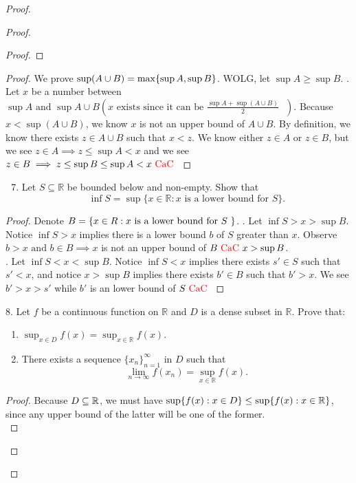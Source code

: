 \documentclass{report}
\begin{document}
\begin{proof}
\begin{proof}
\begin{proof}
\end{proof}
\begin{proof}
We prove $\sup (A\cup B)=\max \{ \sup A,\sup B \}$. WOLG, let $\sup A\geq \sup B$. . Let $x$ be a number between  $\sup A\text{ and }\sup A\cup B(x\text{ exists since it can be $\frac{\sup A+\sup (A\cup B)}{2}$ })$. Because $x<\sup (A\cup B)$, we know $x$ is not an upper bound of  $A\cup B$. By definition, we know there exists $z\in A\cup B$ such that $x<z$. We know either $z \in A$ or $z \in B$, but we see $z \in A\implies z\leq \sup A<x$ and we see $z \in B\implies z\leq \sup B\leq \sup A<x\text{ \textcolor{red}{CaC} }$
\end{proof}
\begin{question}{}{}
\begin{enumerate}
    \setcounter{enumi}{6}
    \item Let \( S \subseteq \mathbb{R} \) be bounded below and non-empty. Show that
    \[ \inf S = \sup\{ x \in \mathbb{R} : x \text{ is a lower bound for } S \}. \]
\end{enumerate}
\end{question}
\begin{proof}
Denote $B=\{ x\in R: x\text{ is a lower bound for $S$ } \}$. . Let $\inf S>x>\sup B$. Notice $\inf S>x$ implies there is a lower bound  $b$ of  $S$ greater than  $x$. Observe $b>x\text{ and }b \in B\implies x$ is not an upper bound of $B\text{ \textcolor{red}{CaC} } x>\sup B$.\\

. Let $\inf S<x<\sup B$. Notice $\inf S<x$ implies there exists $s' \in S$ such that $s'<x$, and notice $x> \sup B$ implies there exists $b'\in B$ such that $b'>x$. We see  $b'>x>s'$ while  $b'$ is an lower bound of  $S\text{ \textcolor{red}{CaC} }$
\end{proof}
\begin{question}{}{}
8. Let \( f \) be a continuous function on \( \mathbb{R} \) and \( D \) is a dense subset in \( \mathbb{R} \). Prove that:
\begin{enumerate}
    \item \( \sup_{x \in D} f(x) = \sup_{x \in \mathbb{R}} f(x) \).
    \item There exists a sequence \( \{x_n\}_{n=1}^{\infty} \) in \( D \) such that 
    \[
    \lim_{n \to \infty} f(x_n) = \sup_{x \in \mathbb{R}} f(x).
    \]
\end{enumerate}
\end{question}
\begin{proof}
Because $D\subseteq \mathbb{R}$, we must have $\sup \{ f(x): x\in D \}\leq \sup \{ f(x): x\in \mathbb{R} \}$, since any upper bound of the latter will be one of the former.\\


\end{proof}
\end{proof}
\end{proof}
\end{document}
